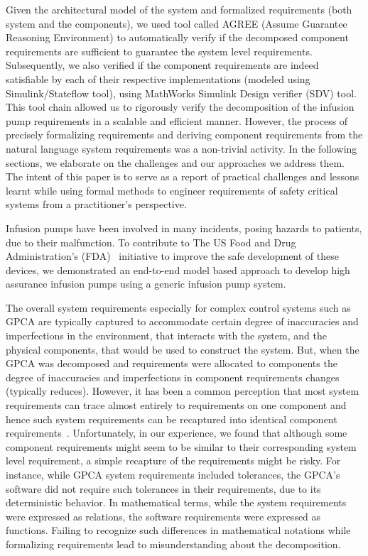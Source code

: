 Given the architectural model of the system and formalized requirements (both system and the components), we used tool called AGREE (Assume Guarantee Reasoning Environment) to automatically verify if the decomposed component requirements are sufficient to guarantee the system level requirements. Subsequently, we also verified if the component requirements are indeed satisfiable by each of their respective implementations (modeled using Simulink/Stateflow tool), using MathWorks Simulink Design verifier (SDV) tool. This tool chain allowed us to rigorously verify the decomposition of the infusion pump requirements in a scalable and efficient manner. However, the process of precisely formalizing requirements and deriving component requirements from the natural language system requirements was a non-trivial activity. In the following sections, we elaborate on the challenges  and our approaches we address them.
The intent of this paper is to serve as a report of practical challenges and lessons learnt while using formal methods to engineer requirements of safety critical systems from a practitioner's perspective.

Infusion pumps have been involved in many incidents, posing hazards to patients, due to their malfunction. To contribute to The US Food and Drug Administration's (FDA)~\cite{fda2010whitepaper} initiative to improve the safe development of these devices, we demonstrated an end-to-end model based approach to develop high assurance infusion pumps using a generic infusion pump system.

The overall system requirements especially for complex control systems such as GPCA are typically captured to accommodate certain degree of inaccuracies and imperfections in the environment, that interacts with the system, and the physical components, that would be used to construct the system. But, when the GPCA was decomposed and requirements were allocated to components the degree of inaccuracies and imperfections in component requirements changes (typically reduces). However, it has been a common perception that most system requirements can trace almost entirely to requirements on one component and hence such system requirements can be recaptured into identical component requirements~\cite{Miller01:dasc}. Unfortunately, in our experience, we found that although some component requirements might seem to be similar to their corresponding system level requirement, a simple recapture of the requirements might be risky. For instance, while GPCA system requirements included tolerances, the GPCA's software did not require such tolerances in their requirements, due to its deterministic behavior. In mathematical terms, while the system requirements were expressed as relations, the software requirements were expressed as functions. Failing to recognize such differences in mathematical notations while formalizing requirements lead to misunderstanding about the decomposition.

